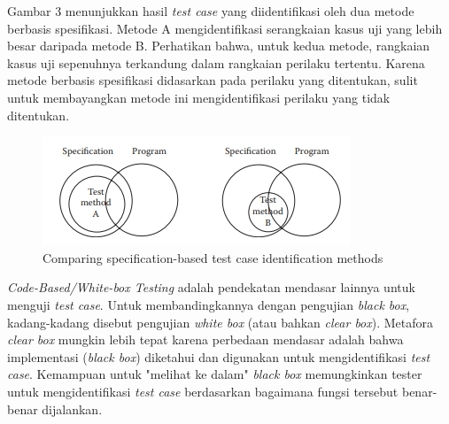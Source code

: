 \documentclass[a4paper,twoside]{article}
\begin{document}
\begin{enumerate}
Gambar 3 menunjukkan hasil \textit{test case} yang diidentifikasi oleh dua metode berbasis spesifikasi. Metode A mengidentifikasi serangkaian kasus uji yang lebih besar daripada metode B. Perhatikan bahwa, untuk kedua metode, rangkaian kasus uji sepenuhnya terkandung dalam rangkaian perilaku tertentu. Karena metode berbasis spesifikasi didasarkan pada perilaku yang ditentukan, sulit untuk membayangkan metode ini mengidentifikasi perilaku yang tidak ditentukan.
\begin{figure}
	\includegraphics[scale=1.2]{../DokumenSkripsi/gambar/compareAB}
	\centering
	\caption{Comparing specification-based test case identification methods}
\end{figure}
\textit{Code-Based/White-box Testing} adalah pendekatan mendasar lainnya untuk menguji \textit{test case}. Untuk membandingkannya dengan pengujian \textit{black box}, kadang-kadang disebut pengujian \textit{white box} (atau bahkan \textit{clear box}). Metafora \textit{clear box} mungkin lebih tepat karena perbedaan mendasar adalah bahwa implementasi (\textit{black box}) diketahui dan digunakan untuk mengidentifikasi \textit{test case}. Kemampuan untuk "melihat ke dalam" \textit{black box} memungkinkan tester untuk mengidentifikasi \textit{test case} berdasarkan bagaimana fungsi tersebut benar-benar dijalankan.


\end{enumerate}
\end{document}
